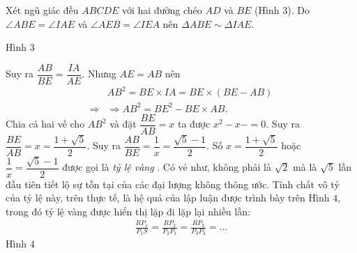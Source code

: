 \begin{multicols}{2}
	Xét ngũ giác đều $ABCDE$  với hai đường chéo $AD$  và $BE$  (Hình $3$). Do $\angle ABE = \angle IAE$ và $\angle AEB = \angle IEA$  nên $\Delta ABE \sim \Delta IAE$.  
	
	Hình $3$
	
	Suy ra $\dfrac{AB}{BE} = \dfrac{IA}{AE}$. Nhưng $AE = AB$  nên 
	\begin{align*}
		&A{B^2} = BE \times IA = BE \times \left( {BE - AB} \right)\\
		\Rightarrow & \Rightarrow A{B^2} = B{E^2} - BE \times AB.
	\end{align*}
	Chia cả hai vế cho $AB^2$  và đặt $\dfrac{BE}{AB} = x$  ta được $x^2 - x - = 0$.  Suy ra $\dfrac{BE}{AB} = x = \dfrac{1 + \sqrt{5}}{2}$. Suy ra $\dfrac{AB}{BE} = \dfrac{1}{x} = \dfrac{\sqrt{5} -1}{2}$. Số $x = \dfrac{1 + \sqrt{5}}{2}$  hoặc $\dfrac{1}{x} = \dfrac{\sqrt{5} - 1}{2}$  được gọi là \textit{tỷ lệ vàng}
	\vskip 0.1cm.
	Có vẻ như, không phải là $\sqrt{2}$  mà là  $\sqrt{5}$ lần đầu tiên tiết lộ sự tồn tại của các đại lượng không thông ước. Tính chất vô tỷ của tỷ lệ này, trên thực tế, là hệ quả của lập luận được trình bày trên Hình $4$, trong đó tỷ lệ vàng được hiển thị lặp đi lặp lại nhiều lần:
	\begin{align*}
		\frac{{R{P_1}}}{{{P_1}S}} = \frac{{R{P_2}}}{{{P_2}{P_1}}} = \frac{{R{P_3}}}{{{P_3}{P_2}}} = \ldots
	\end{align*}
	Hình $4$
	

\end{multicols}
